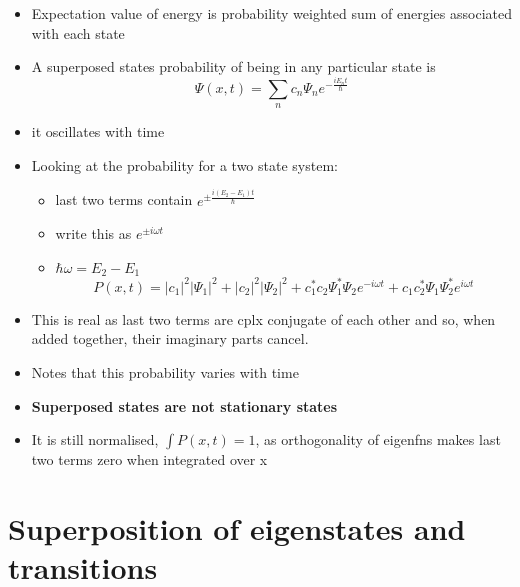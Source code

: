\documentclass[a4paper,11pt,normalem]{article}
\begin{document}
\begin{itemize}
\item
  Expectation value of energy is probability weighted sum of energies
  associated with each state
\item
  A superposed states probability of being in any particular state is \[
  \Psi(x,t) = \sum_{n} c_{n}\Psi_{n}e^{-\frac{iE_{n}t}{\hbar}}
  \]
\item
  it oscillates with time
\item
  Looking at the probability for a two state system:
  \begin{itemize}
  \item
    last two terms contain \(e^{\pm\frac{i(E_{2} - E_{1})t}{\hbar}}\)
  \item
    write this as \(e^{\pm i\omega t}\)
  \item
    \(\hbar\omega = E_{2} - E_{1}\) \[
    P(x,t) = |c_{1}|^{2}|\Psi_{1}|^2 + |c_{2}|^{2}|\Psi_{2}|^{2} + c_{1}^{*}c_{2}\Psi_{1}^{*}\Psi_{2}e^{-i\omega t} + c_{1}c_{2}^{*}\Psi_{1}\Psi_{2}^{*}e^{i\omega t}
    \]
  \end{itemize}
\item
  This is real as last two terms are cplx conjugate of each other and
  so, when added together, their imaginary parts cancel.
\item
  Notes that this probability varies with time
\item
  \textbf{Superposed states are not stationary states}
\item
  It is still normalised, \(\int P(x,t) = 1\), as orthogonality of
  eigenfns makes last two terms zero when integrated over x
\end{itemize}

\section{Superposition of eigenstates and transitions}\label{superposition-of-eigenstates-and-transitions}
\end{document}
